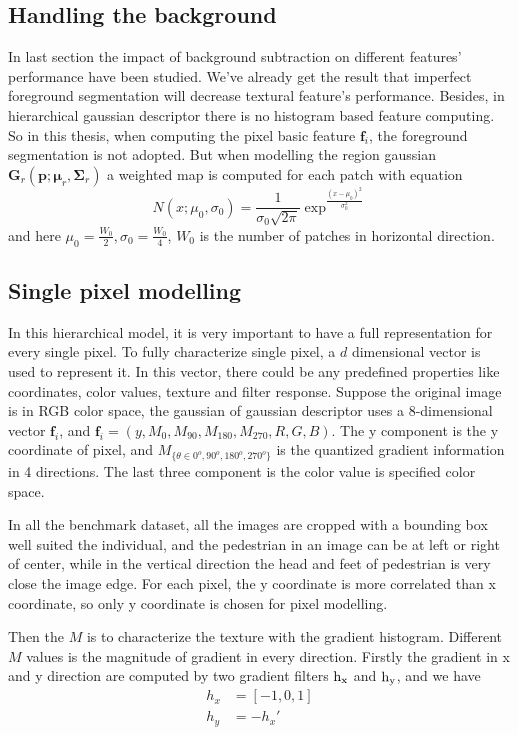 \subsection{Handling the background}
In last section the impact of background subtraction on different features' performance have been studied. We've already get the result that imperfect foreground segmentation will decrease textural feature's performance. Besides, in hierarchical gaussian descriptor there is no histogram based feature computing. So in this thesis, when computing the pixel basic feature $\bm{f}_i$, the foreground segmentation is not adopted. But when modelling the region gaussian $\bm{G}_r(\bm{p};\bm{\mu}_r,\bm{\Sigma}_r)$ a weighted map is computed for each patch with equation
\begin{equation} 
N(x;\mu_0,\sigma_0) = \frac{1}{\sigma_0\sqrt{2\pi}} \exp^{\frac{(x - \mu_0)^2}{\sigma_0^2}}
\end{equation}
and here $\mu_0 = \frac{W_0}{2}, \sigma_0 = \frac{W_0}{4}$, $W_0$ is the number of patches in horizontal direction.
\subsection{Single pixel modelling}

In this hierarchical model, it is very important to have a full representation for every single pixel. To fully characterize single pixel, a $d$ dimensional vector is used to represent it. In this vector, there could be any predefined properties like coordinates, color values, texture and filter response. Suppose the original image is in RGB color space, the gaussian of gaussian descriptor uses a 8-dimensional vector $\bm{f}_i$, and 
$\bm{f}_i = (y,M_0,M_{90},M_{180},M_{270},R,G,B)$.
The y component is the y coordinate of pixel, and $M_{\{{\theta}\in{0^o,90^o,180^o,270^o}\}}$ is the quantized gradient information in 4 directions. The last three component is the color value is specified color space.

In all the benchmark dataset, all the images are cropped with a bounding box well suited the individual, and the pedestrian in an image can be at left or right of center, while in the vertical direction the head and feet of pedestrian is very close the image edge. For each pixel, the y coordinate is more correlated than x coordinate, so only y coordinate is chosen for pixel modelling. 

Then the $M$ is to characterize the texture with the gradient histogram. Different $M$ values is the magnitude of gradient in every direction. 
Firstly the gradient in x and y direction are computed by two gradient filters $\rm{h}_x$ and $\rm{h}_y$, and we have 
\begin{equation}
\begin{aligned}
h_x &= [-1, 0, 1]\\
h_y &= -h_x'
\end{aligned}
\end{equation}

